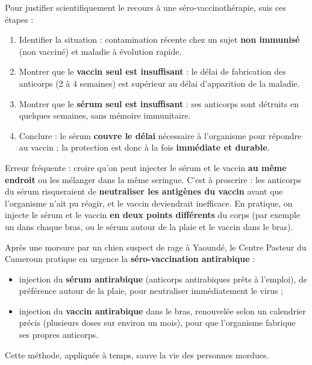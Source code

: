 \documentclass[11pt]{article}
\newcounter{popsec}
\newcounter{popsub}
\newcommand{\courssub}[1]{%
  \stepcounter{popsub}%
  \par\vspace{9pt}\noindent{\popxbold\fontsize{11.5}{13}\selectfont\color{popink}{\color{poporange}\thepopsec.\thepopsub}\hspace{6pt}#1}\par\nopagebreak\vspace{4pt}
}
\begin{document}
\begin{methode}
Pour justifier scientifiquement le recours à une séro-vaccinothérapie, suis ces étapes :
\begin{enumerate}
\item Identifier la situation : contamination récente chez un sujet \textbf{non immunisé} (non vacciné) et maladie à évolution rapide.
\item Montrer que le \textbf{vaccin seul est insuffisant} : le délai de fabrication des anticorps (2 à 4 semaines) est supérieur au délai d'apparition de la maladie.
\item Montrer que le \textbf{sérum seul est insuffisant} : ses anticorps sont détruits en quelques semaines, sans mémoire immunitaire.
\item Conclure : le sérum \textbf{couvre le délai} nécessaire à l'organisme pour répondre au vaccin ; la protection est donc à la fois \textbf{immédiate et durable}.
\end{enumerate}
\end{methode}

\begin{attention}
Erreur fréquente : croire qu'on peut injecter le sérum et le vaccin \textbf{au même endroit} ou les mélanger dans la même seringue. C'est à proscrire : les anticorps du sérum risqueraient de \textbf{neutraliser les antigènes du vaccin} avant que l'organisme n'ait pu réagir, et le vaccin deviendrait inefficace. En pratique, on injecte le sérum et le vaccin \textbf{en deux points différents} du corps (par exemple un dans chaque bras, ou le sérum autour de la plaie et le vaccin dans le bras).
\end{attention}

\courssub{Exemples d'application}

\begin{exemplebox}
Après une morsure par un chien suspect de rage à Yaoundé, le Centre Pasteur du Cameroun pratique en urgence la \textbf{séro-vaccination antirabique} :
\begin{itemize}
\item injection du \textbf{sérum antirabique} (anticorps antirabiques prêts à l'emploi), de préférence autour de la plaie, pour neutraliser immédiatement le virus ;
\item injection du \textbf{vaccin antirabique} dans le bras, renouvelée selon un calendrier précis (plusieurs doses sur environ un mois), pour que l'organisme fabrique ses propres anticorps.
\end{itemize}
Cette méthode, appliquée à temps, sauve la vie des personnes mordues.
\end{exemplebox}
\end{document}
